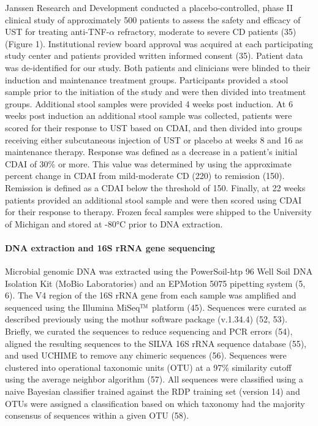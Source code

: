 \documentclass[12pt,]{article}
\let\oldparagraph\paragraph
\renewcommand{\paragraph}[1]{\oldparagraph{#1}\mbox{}}
\begin{document}
Janssen Research and Development conducted a placebo-controlled, phase
II clinical study of approximately 500 patients to assess the safety and
efficacy of UST for treating anti-TNF-\({\alpha}\) refractory, moderate
to severe CD patients (35) (Figure 1). Institutional review board
approval was acquired at each participating study center and patients
provided written informed consent (35). Patient data was de-identified
for our study. Both patients and clinicians were blinded to their
induction and maintenance treatment groups. Participants provided a
stool sample prior to the initiation of the study and were then divided
into treatment groups. Additional stool samples were provided 4 weeks
post induction. At 6 weeks post induction an additional stool sample was
collected, patients were scored for their response to UST based on CDAI,
and then divided into groups receiving either subcutaneous injection of
UST or placebo at weeks 8 and 16 as maintenance therapy. Response was
defined as a decrease in a patient's initial CDAI of 30\% or more. This
value was determined by using the approximate percent change in CDAI
from mild-moderate CD (220) to remission (150). Remission is defined as
a CDAI below the threshold of 150. Finally, at 22 weeks patients
provided an additional stool sample and were then scored using CDAI for
their response to therapy. Frozen fecal samples were shipped to the
University of Michigan and stored at -80°C prior to DNA extraction.

\paragraph{DNA extraction and 16S rRNA gene
sequencing}\label{dna-extraction-and-16s-rrna-gene-sequencing}

Microbial genomic DNA was extracted using the PowerSoil-htp 96 Well Soil
DNA Isolation Kit (MoBio Laboratories) and an EPMotion 5075 pipetting
system (5, 6). The V4 region of the 16S rRNA gene from each sample was
amplified and sequenced using the Illumina
MiSeq\(\text{\texttrademark}\) platform (45). Sequences were curated as
described previously using the mothur software package (v.1.34.4) (52,
53). Briefly, we curated the sequences to reduce sequencing and PCR
errors (54), aligned the resulting sequences to the SILVA 16S rRNA
sequence database (55), and used UCHIME to remove any chimeric sequences
(56). Sequences were clustered into operational taxonomic units (OTU) at
a 97\% similarity cutoff using the average neighbor algorithm (57). All
sequences were classified using a naive Bayesian classifier trained
against the RDP training set (version 14) and OTUs were assigned a
classification based on which taxonomy had the majority consensus of
sequences within a given OTU (58).
\end{document}
